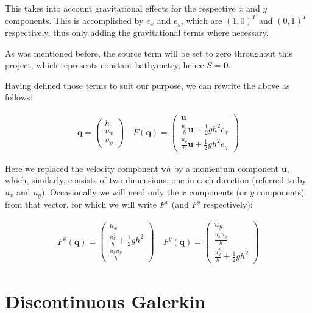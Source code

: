 \documentclass[a4paper, twoside]{article}
\begin{document}
This takes into account gravitational effects for the respective $x$ and $y$ components. This is accomplished by $e_x$ and $e_y$, which are $\left(1, 0\right)^T$ and $\left(0, 1\right)^T$ respectively, thus only adding the gravitational terms where necessary.

As was mentioned before, the source term will be set to zero throughout this project, which represents constant bathymetry, hence $S=\mathbf{0}$.

Having defined those terms to suit our purpose, we can rewrite the above as follows:

\begin{eqnarray}
  \label{eqn:shallow-water-flux}
  \mathbf{q} =
  \begin{pmatrix}
    h \\ u_x \\ u_y
  \end{pmatrix} \quad
  F(\mathbf{q}) =
  \begin{pmatrix}
    \mathbf{u} \\ \frac{u_x}{h}\mathbf{u} + \frac{1}{2} g h^2 e_x \\ \frac{u_y}{h}\mathbf{u} + \frac{1}{2} g h^2 e_y
  \end{pmatrix}
\end{eqnarray}

Here we replaced the velocity component $\mathbf{v}h$ by a momentum component $\mathbf{u}$, which, similarly, consists of two dimensions, one in each direction (referred to by $u_x$ and $u_y$). Occasionally we will need only the $x$ components (or $y$ components) from that vector, for which we will write $F^x$ (and $F^y$ respectively):

\begin{eqnarray*}
  F^x(\mathbf{q}) =
  \begin{pmatrix}
    u_x \\ \frac{u_x^2}{h} + \frac{1}{2} g h^2 \\ \frac{u_x u_y}{h}
  \end{pmatrix}
  \quad
  F^y(\mathbf{q}) =
  \begin{pmatrix}
    u_y \\ \frac{u_x u_y}{h} \\ \frac{u_y^2}{h} + \frac{1}{2} g h^2
  \end{pmatrix}
\end{eqnarray*}

\section{Discontinuous Galerkin}
\label{sec:discontinuous-galerkin}
\end{document}
